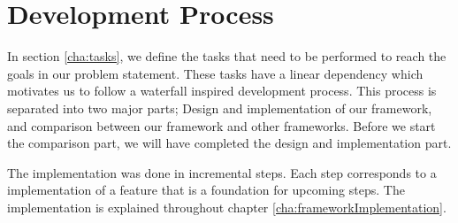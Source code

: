 \section{Development Process}\label{cha:developmentProcess}
In section \ref{cha:tasks}, we define the tasks that need to be performed to reach the goals in our problem statement. These tasks have a linear dependency which motivates us to follow a waterfall inspired development process. This process is separated into two major parts; Design and implementation of our framework, and comparison between our framework and other frameworks. Before we start the comparison part, we will have completed the design and implementation part.

The implementation was done in incremental steps. Each step corresponds to a implementation of a feature that is a foundation for upcoming steps. The implementation is explained throughout chapter \ref{cha:frameworkImplementation}.

